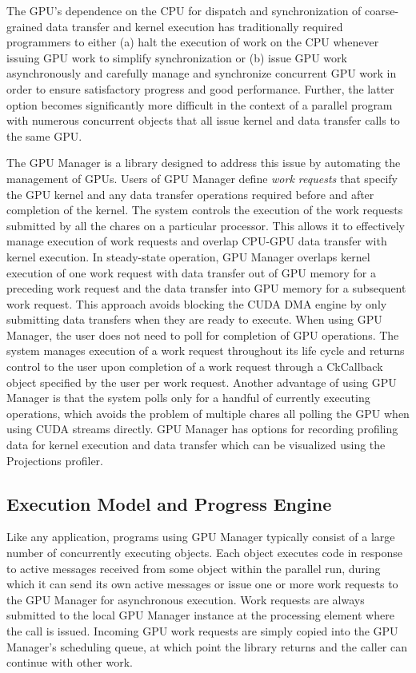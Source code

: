 \documentclass[10pt]{report}
\begin{document}
The GPU's dependence on the CPU for dispatch and synchronization of
coarse-grained data transfer and kernel execution has traditionally required
programmers to either (a) halt the execution of work on the CPU whenever issuing
GPU work to simplify synchronization or (b) issue GPU work asynchronously and
carefully manage and synchronize concurrent GPU work in order to ensure
satisfactory progress and good performance. Further, the latter option becomes
significantly more difficult in the context of a parallel program with numerous
concurrent objects that all issue kernel and data transfer calls to the same GPU.

The \charmpp{} GPU Manager is a library designed to address this issue by
automating the management of GPUs. Users of GPU Manager define \emph{work requests}
that specify the GPU kernel and any data transfer operations required before
and after completion of the kernel. The system controls the execution of the
work requests submitted by all the chares on a particular processor. This allows
it to effectively manage execution of work requests and overlap CPU-GPU data
transfer with kernel execution. In steady-state operation, GPU Manager overlaps
kernel execution of one work request with data transfer out of GPU memory for a
preceding work request and the data transfer into GPU memory for a subsequent
work request. This approach avoids blocking the CUDA DMA engine by only submitting
data transfers when they are ready to execute. When using GPU Manager, the user
does not need to poll for completion of GPU operations. The system manages
execution of a work request throughout its life cycle and returns control to the
user upon completion of a work request through a CkCallback object specified by
the user per work request. Another advantage of using GPU Manager is that the
system polls only for a handful of currently executing operations, which avoids
the problem of multiple chares all polling the GPU when using CUDA streams
directly. GPU Manager has options for recording profiling data for kernel
execution and data transfer which can be visualized using the \charmpp{}
Projections profiler.

\subsection{Execution Model and Progress Engine}

Like any \charmpp{} application, programs using GPU Manager typically consist of a
large number of concurrently executing objects. Each object executes code in
response to active messages received from some object within the parallel run,
during which it can send its own active messages or issue one or more work
requests to the GPU Manager for asynchronous execution. Work requests are always
submitted to the local GPU Manager instance at the processing element where the
call is issued. Incoming GPU work requests are simply copied into the GPU
Manager's scheduling queue, at which point the library returns and the caller
can continue with other work.
\end{document}
